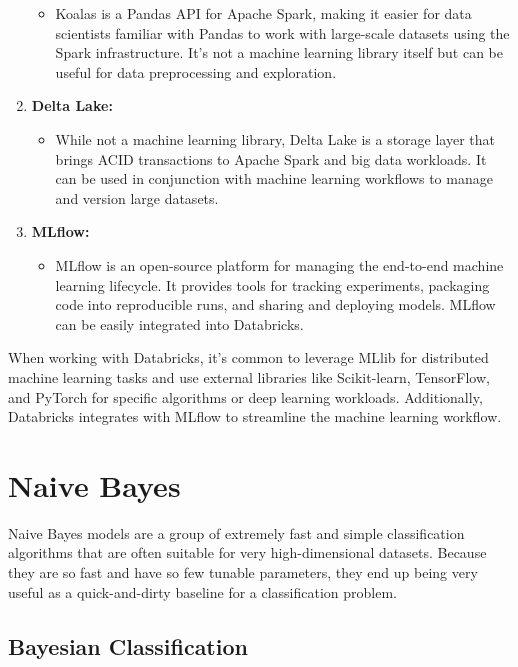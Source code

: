 \documentclass[
]{book}
\providecommand{\tightlist}{%
  \setlength{\itemsep}{0pt}\setlength{\parskip}{0pt}}
\begin{document}
\begin{enumerate}
  \begin{itemize}
  \tightlist
  \item
    Koalas is a Pandas API for Apache Spark, making it easier for data scientists familiar with Pandas to work with large-scale datasets using the Spark infrastructure. It's not a machine learning library itself but can be useful for data preprocessing and exploration.
  \end{itemize}
\item
  \textbf{Delta Lake:}

  \begin{itemize}
  \tightlist
  \item
    While not a machine learning library, Delta Lake is a storage layer that brings ACID transactions to Apache Spark and big data workloads. It can be used in conjunction with machine learning workflows to manage and version large datasets.
  \end{itemize}
\item
  \textbf{MLflow:}

  \begin{itemize}
  \tightlist
  \item
    MLflow is an open-source platform for managing the end-to-end machine learning lifecycle. It provides tools for tracking experiments, packaging code into reproducible runs, and sharing and deploying models. MLflow can be easily integrated into Databricks.
  \end{itemize}
\end{enumerate}

When working with Databricks, it's common to leverage MLlib for distributed machine learning tasks and use external libraries like Scikit-learn, TensorFlow, and PyTorch for specific algorithms or deep learning workloads. Additionally, Databricks integrates with MLflow to streamline the machine learning workflow.

\hypertarget{naive-bayes}{%
\section{Naive Bayes}\label{naive-bayes}}

Naive Bayes models are a group of extremely fast and simple classification algorithms that are often suitable for very high-dimensional datasets. Because they are so fast and have so few tunable parameters, they end up being very useful as a quick-and-dirty baseline for a classification problem.

\hypertarget{bayesian-classification}{%
\subsection{Bayesian Classification}\label{bayesian-classification}}
\end{document}
